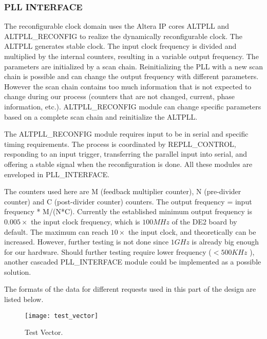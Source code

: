 \subsubsection{PLL INTERFACE}

The reconfigurable clock domain uses the Altera IP cores ALTPLL and ALTPLL\_RECONFIG to realize the dynamically reconfigurable clock. The ALTPLL generates stable clock. The input clock frequency is divided and multiplied by the internal counters, resulting in a variable output frequency. The parameters are initialized by a scan chain. Reinitializing the PLL with a new scan chain is possible and can change the output frequency with different parameters. However the scan chain contains too much information that is not expected to change during our process (counters that are not changed, current, phase information, etc.). ALTPLL\_RECONFIG module can change specific parameters based on a complete scan chain and reinitialize the ALTPLL.

The ALTPLL\_RECONFIG module requires input to be in serial and specific timing requirements. The process is coordinated by REPLL\_CONTROL, responding to an input trigger, transferring the parallel input into serial, and offering a stable signal when the reconfiguration is done. All these modules are enveloped in PLL\_INTERFACE.

The counters used here are M (feedback multiplier counter), N (pre-divider counter) and C (post-divider counter) counters. The output frequency = input frequency * M/(N*C). Currently the established minimum output frequency is $0.005\times$ the input clock frequency, which is $100MHz$ of the DE2 board by default. The maximum can reach $10\times$ the input clock, and theoretically can be increased. However, further testing is not done since $1GHz$ is already big enough for our hardware. Should further testing require lower frequency ($<500KHz$ ), another cascaded PLL\_INTERFACE module could be implemented as a possible solution.

The formats of the data for different requests used in this part of the design are listed below.


\begin{figure}[h!]
 \centering
 \texttt{[image: test\_vector]}
 \caption{Test Vector.}
 \label{fig:test_vector}
\end{figure}






